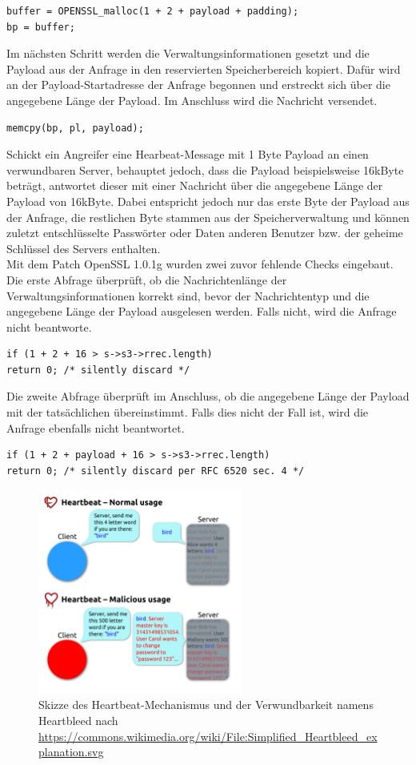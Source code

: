 %
\begin{lstlisting}
buffer = OPENSSL_malloc(1 + 2 + payload + padding);
bp = buffer;
\end{lstlisting}
%
Im nächsten Schritt werden die Verwaltungsinformationen gesetzt und die Payload aus der Anfrage in den reservierten Speicherbereich kopiert. Dafür wird an der Payload-Startadresse der Anfrage begonnen und erstreckt sich über die angegebene Länge der Payload. Im Anschluss wird die Nachricht versendet.
%
\begin{lstlisting}
memcpy(bp, pl, payload);
\end{lstlisting}
%
Schickt ein Angreifer eine Hearbeat-Message mit 1 Byte Payload an einen verwundbaren Server, behauptet jedoch, dass die Payload beispielsweise 16kByte beträgt, antwortet dieser mit einer Nachricht über die angegebene Länge der Payload von 16kByte. Dabei entspricht jedoch nur das erste Byte der Payload aus der Anfrage, die restlichen Byte stammen aus der Speicherverwaltung und können zuletzt entschlüsselte Passwörter oder Daten anderen Benutzer bzw. der geheime Schlüssel des Servers enthalten.
%
\vspace{11pt}
\\
%
Mit dem Patch OpenSSL 1.0.1g wurden zwei zuvor fehlende Checks eingebaut. Die erste Abfrage überprüft, ob die Nachrichtenlänge der Verwaltungsinformationen korrekt sind, bevor der Nachrichtentyp und die angegebene Länge der Payload ausgelesen werden. Falls nicht, wird die Anfrage nicht beantworte.
%
\begin{lstlisting}
if (1 + 2 + 16 > s->s3->rrec.length)
return 0; /* silently discard */
\end{lstlisting}
%
Die zweite Abfrage überprüft im Anschluss, ob die angegebene Länge der Payload mit der tatsächlichen übereinstimmt. Falls dies nicht der Fall ist, wird die Anfrage ebenfalls nicht beantwortet.
\begin{lstlisting}
if (1 + 2 + payload + 16 > s->s3->rrec.length)
return 0; /* silently discard per RFC 6520 sec. 4 */
\end{lstlisting}
%
\begin{figure}[htbp]
	\centering
	\includegraphics[width=0.6\textwidth]{images/heartbleed/heartbleed.png}
	\caption{Skizze des Heartbeat-Mechanismus und der Verwundbarkeit namens Heartbleed nach \url{https://commons.wikimedia.org/wiki/File:Simplified_Heartbleed_explanation.svg}}
\end{figure}

